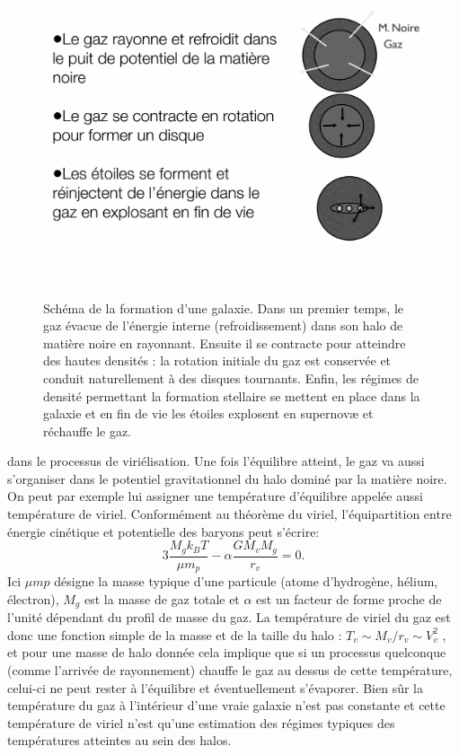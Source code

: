\begin{figure}[htbp]
	\centering
		\includegraphics[height=10cm]{figs/coolgal.png}
		\caption[Formation schématique d'une galaxie]{Schéma de la formation d'une galaxie. Dans un premier temps, le gaz évacue de l'énergie interne (refroidissement) dans son halo de matière noire en rayonnant. Ensuite il se contracte pour atteindre des hautes densités : la rotation initiale du gaz est conservée et conduit naturellement à des disques tournants. Enfin, les régimes de densité permettant la formation stellaire se mettent en place dans la galaxie et en fin de vie les étoiles explosent en supernovæ et réchauffe le gaz. }
	\label{f:coolgal}
\end{figure}


 dans le processus de viriélisation. Une fois l'équilibre atteint, le gaz va aussi s'organiser dans le potentiel gravitationnel du halo dominé par la matière noire. On peut par exemple lui assigner une température d'équilibre appelée aussi température de viriel. Conformément au théorème du viriel, l'équipartition entre énergie cinétique et potentielle des baryons peut s'écrire:
\begin{equation}
3\frac{M_gk_B T}{\mu m_p} - \alpha \frac{G M_v M_g}{r_v}=0.
\end{equation}
Ici $\mu mp$ désigne la masse typique d'une particule (atome d'hydrogène, hélium, électron), $M_g$ est la masse de gaz totale et $\alpha$ est un facteur de forme proche de l'unité dépendant du profil de masse du gaz. La température de viriel du gaz est donc une fonction simple de la masse et de la taille du halo : $T_v\sim M_v/r_v \sim V_v^2$ , et pour une masse de halo donnée cela implique que si un processus quelconque (comme l'arrivée de rayonnement) chauffe le gaz au dessus de cette température, celui-ci ne peut rester à l'équilibre et éventuellement s'évaporer. Bien sûr la température du gaz à l'intérieur d'une vraie galaxie n'est pas constante et cette température de viriel n'est qu'une estimation des régimes typiques des températures atteintes au sein des halos.

